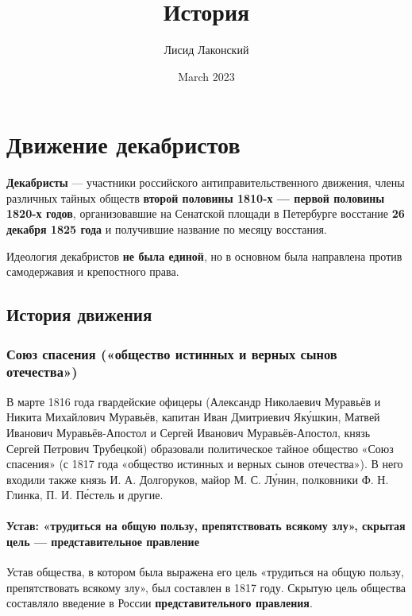 \documentclass{article}
\title{История}
\author{Лисид Лаконский}
\date{March 2023}
\begin{document}
\raggedright

\setcounter{tocdepth}{5}

\maketitle
\tableofcontents
\pagebreak

\section{Движение декабристов}

\textbf{Декабристы} — участники российского антиправительственного движения, члены различных тайных обществ \textbf{второй половины 1810-х — первой половины 1820-х годов}, организовавшие на Сенатской площади в Петербурге восстание \textbf{26 декабря 1825 года} и получившие название по месяцу восстания.

\hfill

Идеология декабристов \textbf{не была единой}, но в основном была направлена против самодержавия и крепостного права.

\subsection{История движения}

\subsubsection{Союз спасения («общество истинных и верных сынов отечества»)}

В марте 1816 года гвардейские офицеры (Александр Николаевич Муравьёв и Никита Михайлович Муравьёв, капитан Иван Дмитриевич Як\'{у}шкин, Матвей Иванович Муравьёв-Апостол и Сергей Иванович Муравьёв-Апостол, князь Сергей Петрович Трубецкой) образовали политическое тайное общество «Союз спасения» (с 1817 года «общество истинных и верных сынов отечества»). В него входили также князь И. А. Долгоруков, майор М. С. Л\'{у}нин, полковники Ф. Н. Глинка, П. И. П\'{е}стель и другие.

\paragraph{Устав: «трудиться на общую пользу, препятствовать всякому злу», скрытая цель — представительное правление}

Устав общества, в котором была выражена его цель «трудиться на общую пользу, препятствовать всякому злу», был составлен в 1817 году. Скрытую цель общества составляло введение в России \textbf{представительного правления}.
\end{document}
